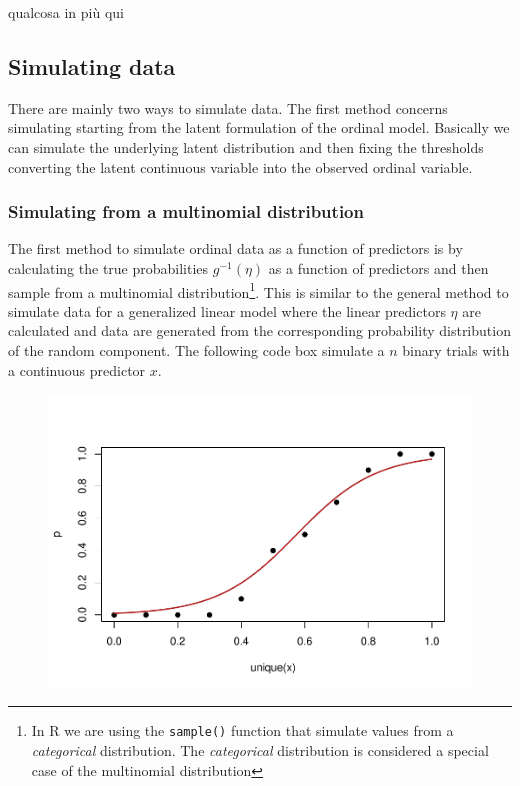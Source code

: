 \documentclass[
  man,floatsintext]{apa6}
\begin{document}
qualcosa in più qui

\subsection{Simulating data}\label{simulating-data}

There are mainly two ways to simulate data. The first method concerns simulating starting from the latent formulation of the ordinal model. Basically we can simulate the underlying latent distribution and then fixing the thresholds converting the latent continuous variable into the observed ordinal variable.

\subsubsection{Simulating from a multinomial distribution}\label{simulating-from-a-multinomial-distribution}

The first method to simulate ordinal data as a function of predictors is by calculating the true probabilities \(g^{-1}(\eta)\) as a function of predictors and then sample from a multinomial distribution\footnote{In R we are using the \texttt{sample()} function that simulate values from a \emph{categorical} distribution. The \emph{categorical} distribution is considered a special case of the multinomial distribution}. This is similar to the general method to simulate data for a generalized linear model where the linear predictors \(\eta\) are calculated and data are generated from the corresponding probability distribution of the random component. The following code box simulate a \(n\) binary trials with a continuous predictor \(x\).

\scriptsize

\begin{figure}

{\centering \includegraphics{paper-new_files/figure-latex/unnamed-chunk-4-1} 

}

\caption{ }\label{fig:unnamed-chunk-4}
\end{figure}
\end{document}
